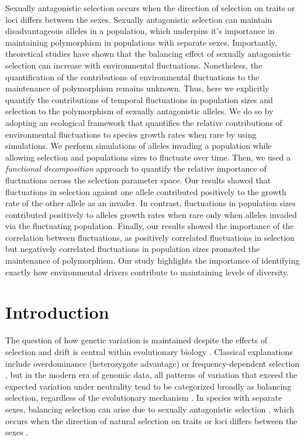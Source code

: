 \documentclass[12pt]{article}
\begin{document}
Sexually antagonistic selection occurs when the direction of selection on traits or loci differs between the sexes. Sexually antagonistic selection can maintain disadvantageous alleles in a population, which underpins it's importance in maintaining polymorphism in populations with separate sexes. Importantly, theoretical studies have shown that the balancing effect of sexually antagonistic selection can increase with environmental fluctuations. Nonetheless, the quantification of the contributions of environmental fluctuations to the maintenance of polymorphism remains unknown. Thus, here we explicitly quantify the contributions of temporal fluctuations in population sizes and selection to the polymorphism of sexually antagonistic alleles. We do so by adopting an ecological framework that quantifies the relative contributions of environmental fluctuations to species growth rates when rare by using simulations. We perform simulations of alleles invading a population while allowing selection and populations sizes to fluctuate over time. Then, we used  a \textit{functional decomposition} approach to quantify the relative importance of fluctuations across the selection parameter space. Our results showed that fluctuations in selection agaisnt one allele contributed positively to the growth rate of the other allele as an invader. In contrast, fluctuations in population sizes contributed positively to alleles growth rates when rare only when alleles invaded via the fluctuating population. Finally, our results showed the importance of the correlation between fluctuations, as positively correlated fluctuations in selection but negatively correlated fluctuations in population sizes promoted the maintenance of polymorphism. Our study highlights the importance of identifying exactly how environmental drivers contribute to maintaining levels of diversity.

\clearpage
\section{Introduction}
The question of how genetic variation is maintained despite the effects of selection and drift is central within evolutionary biology \citep{walsh_evolution_2018}. Classical explanations include overdominance (heterozygote advantage) or frequency-dependent selection \citep{hedrick2007balancing}, but in the modern era of genomic data, all patterns of variation that exceed the expected variation under neutrality tend to be categorized broadly as balancing selection, regardless of the evolutionary mechanism \citep{mitchell-olds_which_2007}. In species with separate sexes, balancing selection can arise due to sexually antagonistic selection \citep{connallon2014balancing}, which occurs when the direction of natural selection on traits or loci differs between the sexes \citep{lande1980sexual,arnqvist2013sexual}.
\end{document}

